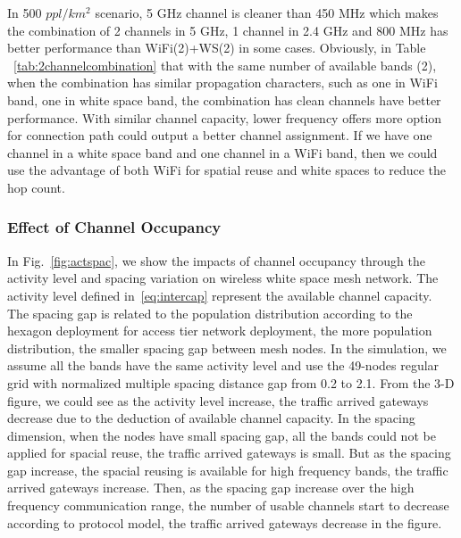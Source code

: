 In 500 $ppl/km^2$ scenario, 5 GHz channel is cleaner than 450 MHz which makes 
the combination of 2 channels in 5 GHz, 1 channel in 2.4 GHz and 800 MHz has 
better performance than WiFi(2)+WS(2) in some cases.  Obviously, in Table
~\ref{tab:2channelcombination} that with the same number of available bands (2), 
when the combination has similar propagation characters, such as one in WiFi band, 
one in white space band, the combination has clean channels have better performance. 
With similar channel capacity, lower frequency offers more option for connection 
path could output a better channel assignment. If we have one channel in a white 
space band and one channel in a WiFi band, then we could use the advantage of both 
WiFi for spatial reuse and white spaces to reduce the hop count. 



\subsubsection{Effect of Channel Occupancy}

In Fig.~\ref{fig:actspac}, we show the impacts of channel occupancy through 
the activity level and spacing variation on wireless white space mesh network. 
The activity level defined in~\ref{eq:intercap} represent the available channel
capacity. The spacing gap is related to the population distribution according to 
the hexagon deployment for access tier network deployment, the more population
distribution, the smaller spacing gap between mesh nodes. In the simulation, we 
assume all the bands have the same activity level and use the 49-nodes regular 
grid with normalized multiple spacing distance gap from 0.2 to 2.1. From the 3-D 
figure, we could see as the activity level increase, the traffic arrived gateways 
decrease due to the deduction of available channel capacity. In the spacing dimension, 
when the nodes have small spacing gap, all the bands could not be applied for 
spacial reuse, the traffic arrived gateways is small. But as the spacing gap 
increase, the spacial reusing is available for high frequency bands, the traffic 
arrived gateways increase. Then, as the spacing gap increase over the high 
frequency communication range, the number of usable channels start to decrease 
according to protocol model, the traffic arrived gateways decrease in the figure.

